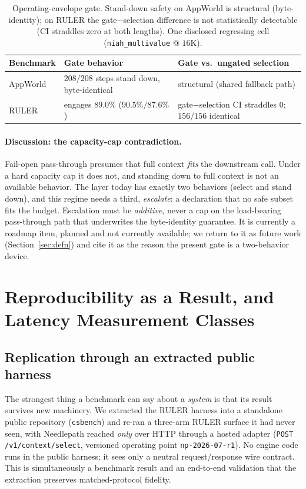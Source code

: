 \documentclass[11pt]{article}
\newcommand{\NP}{Needlepath}
\newcommand{\oppoint}{\texttt{np-2026-07-r1}}
\newcommand{\wire}{\texttt{POST /v1/context/select}}
\begin{document}
\begin{table}[t]
\centering
\small
\begin{tabular}{@{}lll@{}}
\toprule
Benchmark & Gate behavior & Gate vs.\ ungated selection \\
\midrule
AppWorld & $208/208$ steps stand down, byte-identical & structural (shared fallback path) \\
RULER    & engages $89.0\%$ ($90.5\%/87.6\%$) & gate$-$selection CI straddles $0$; $156/156$ identical \\
\bottomrule
\end{tabular}
\caption{Operating-envelope gate. Stand-down safety on AppWorld is structural (byte-identity); on
RULER the gate$-$selection difference is not statistically detectable (CI straddles zero at both
lengths). One disclosed regressing cell (\texttt{niah\_multivalue} @ $16$K).}
\label{tab:gate}
\end{table}

\paragraph{Discussion: the capacity-cap contradiction.} Fail-open pass-through presumes that full
context \emph{fits} the downstream call. Under a hard capacity cap it does not, and standing down
to full context is not an available behavior. The layer today has exactly two behaviors (select
and stand down), and this regime needs a third, \emph{escalate}: a declaration that no safe
subset fits the budget. Escalation must be \emph{additive}, never a cap on the load-bearing
pass-through path that underwrites the byte-identity guarantee. It is currently a roadmap item,
planned and not currently available; we return to it as future work (Section~\ref{sec:defn}) and
cite it as the reason the present gate is a two-behavior device.

\section{Reproducibility as a Result, and Latency Measurement Classes}
\label{sec:repro}

\subsection{Replication through an extracted public harness}
\label{sec:replication}

The strongest thing a benchmark can say about a \emph{system} is that its result survives new
machinery. We extracted the RULER harness into a standalone public repository (\texttt{csbench})
and re-ran a three-arm RULER surface it had never seen, with \NP{} reached \emph{only} over HTTP
through a hosted adapter (\wire{}, versioned operating point \oppoint{}). No engine code runs in
the public harness; it sees only a neutral request/response wire contract. This is simultaneously a
benchmark result and an end-to-end validation that the extraction preserves matched-protocol
fidelity.
\end{document}
